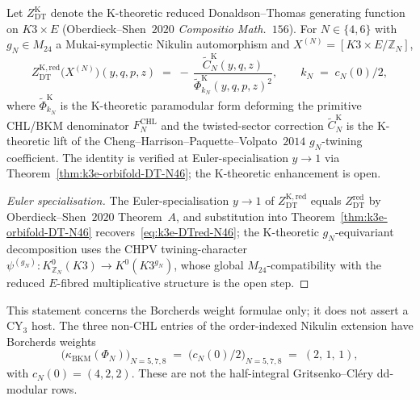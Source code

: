 \begin{conjecture}
\label{prop:k3e-K-theoretic-closure-N46}
Let $Z^{\mathrm{K}}_{\mathrm{DT}}$ denote the K-theoretic reduced Donaldson--Thomas generating function on $K3 \times E$ (Oberdieck--Shen~$2020$ \emph{Compositio Math.}~$156$). For $N \in \{4, 6\}$ with $g_N \in M_{24}$ a Mukai-symplectic Nikulin automorphism and $X^{(N)} = [K3 \times E / \mathbb{Z}_N]$,
\begin{equation}
\label{eq:k3e-K-theoretic-N46}
Z^{\mathrm{K, red}}_{\mathrm{DT}}\bigl(X^{(N)}\bigr)(y, q, p, z) \;=\; -\,\frac{\widetilde C^{\mathrm{K}}_N(y, q, z)}{\widetilde\Phi_{k_N}^{\mathrm{K}}(y, q, p, z)^{2}}, \qquad k_N \;=\; c_N(0)/2,
\end{equation}
where $\widetilde\Phi^{\mathrm{K}}_{k_N}$ is the K-theoretic paramodular form deforming the primitive CHL/BKM denominator $F^{\mathrm{CHL}}_N$ and the twisted-sector correction $\widetilde C^{\mathrm{K}}_N$ is the K-theoretic lift of the Cheng--Harrison--Paquette--Volpato~$2014$ $g_N$-twining coefficient. The identity is verified at Euler-specialisation $y \to 1$ via Theorem~\ref{thm:k3e-orbifold-DT-N46}; the K-theoretic enhancement is open.
\end{conjecture}

\begin{proof}[Euler specialisation]
The Euler-specialisation $y \to 1$ of $Z^{\mathrm{K, red}}_{\mathrm{DT}}$ equals $Z^{\mathrm{red}}_{\mathrm{DT}}$ by Oberdieck--Shen~$2020$ Theorem~$A$, and substitution into Theorem~\ref{thm:k3e-orbifold-DT-N46} recovers~\eqref{eq:k3e-DTred-N46}; the K-theoretic $g_N$-equivariant decomposition uses the CHPV twining-character $\psi^{(g_N)}: K^0_{\mathbb{Z}_N}(K3) \to K^0(K3^{g_N})$, whose global $M_{24}$-compatibility with the reduced $E$-fibred multiplicative structure is the open step.
\end{proof}

\begin{proposition}
\label{prop:k3e-half-integer-metaplectic}
This statement concerns the Borcherds weight formulae only; it does
not assert a CY$_3$ host.
The three non-CHL entries of the order-indexed Nikulin extension have
Borcherds weights
\begin{equation}
\label{eq:k3e-half-integer-weights}
\bigl(\kappa_{\mathrm{BKM}}(\Phi_N)\bigr)_{N = 5, 7, 8} \;=\; \bigl(c_N(0)/2\bigr)_{N = 5, 7, 8} \;=\; (2,\, 1,\, 1),
\end{equation}
with $c_N(0)=(4,2,2)$. These are not the half-integral
Gritsenko--Cl\'ery dd-modular rows.
\end{proposition}

